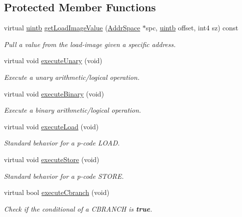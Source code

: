\subsection*{Protected Member Functions}
\begin{DoxyCompactItemize}
\item 
virtual \mbox{\hyperlink{types_8h_a2db313c5d32a12b01d26ac9b3bca178f}{uintb}} \mbox{\hyperlink{class_emulate_pcode_op_ad0820672a7c9f2a1a2457239f8d59378}{get\+Load\+Image\+Value}} (\mbox{\hyperlink{class_addr_space}{Addr\+Space}} $\ast$spc, \mbox{\hyperlink{types_8h_a2db313c5d32a12b01d26ac9b3bca178f}{uintb}} offset, int4 sz) const
\begin{DoxyCompactList}\small\item\em Pull a value from the load-\/image given a specific address. \end{DoxyCompactList}\item 
virtual void \mbox{\hyperlink{class_emulate_pcode_op_acdcfb1ee505eb8eeac882ddef564f18e}{execute\+Unary}} (void)
\begin{DoxyCompactList}\small\item\em Execute a unary arithmetic/logical operation. \end{DoxyCompactList}\item 
virtual void \mbox{\hyperlink{class_emulate_pcode_op_ac33f956b6cf8b205b32324d0a84b38cb}{execute\+Binary}} (void)
\begin{DoxyCompactList}\small\item\em Execute a binary arithmetic/logical operation. \end{DoxyCompactList}\item 
virtual void \mbox{\hyperlink{class_emulate_pcode_op_ab665b04ab8db4b7025e1a5b6a05189ea}{execute\+Load}} (void)
\begin{DoxyCompactList}\small\item\em Standard behavior for a p-\/code L\+O\+AD. \end{DoxyCompactList}\item 
virtual void \mbox{\hyperlink{class_emulate_pcode_op_a3e050bb94bc5f0cca844cc60aa0e4702}{execute\+Store}} (void)
\begin{DoxyCompactList}\small\item\em Standard behavior for a p-\/code S\+T\+O\+RE. \end{DoxyCompactList}\item 
virtual bool \mbox{\hyperlink{class_emulate_pcode_op_a5aa70550f3f75829976b082a87d50d8f}{execute\+Cbranch}} (void)
\begin{DoxyCompactList}\small\item\em Check if the conditional of a C\+B\+R\+A\+N\+CH is {\bfseries{true}}. \end{DoxyCompactList}\item 

\end{DoxyCompactItemize}
